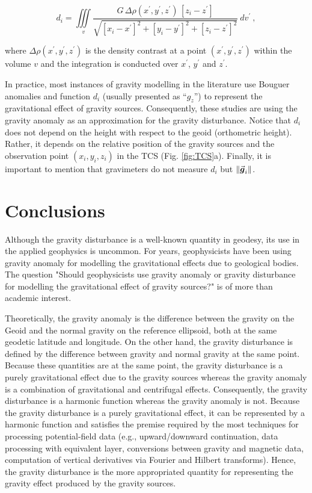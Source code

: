 \documentclass[extra]{gji}
\renewcommand{\vector}[1]{\vec{\mitbf{#1}}}
\begin{document}
\begin{equation}
d_{i} = \iiint\limits_{v}
\frac{G \, \Delta\rho(x^{\prime}, y^{\prime}, z^{\prime}) \,
[z_{i} - z^{\prime}]}
{\sqrt{[x_{i} - x^{\prime}]^{2} +
[y_{i} - y^{\prime}]^{2} + [z_{i} - z^{\prime}]^{2}}} \: dv^{\prime} \: ,
\label{eq:gz-local}
\end{equation}

\noindent
where $\Delta\rho(x^{\prime}, y^{\prime}, z^{\prime})$
is the density contrast at a point $(x^{\prime}, y^{\prime}, z^{\prime})$
within the volume $v$ and the integration is conducted over $x^{\prime}$,
$y^{\prime}$ and $z^{\prime}$.

In practice, most instances of gravity modelling in the literature use Bouguer
anomalies and function $d_{i}$ (usually presented as ``$g_z$'') to represent
the gravitational effect of gravity sources.
Consequently, these studies are using the gravity
anomaly as an approximation for the gravity disturbance.
Notice that $d_{i}$ does not depend on the
height with respect to the geoid (orthometric height).
Rather, it depends on the relative position of the gravity sources and the
observation point $(x_{i}, y_{i}, z_{i})$ in the TCS (Fig. \ref{fig:TCS}a).
Finally, it is important to mention that gravimeters do not measure $d_{i}$ but
$\| \vector{g}_i \|$.


\section{Conclusions}

Although the gravity disturbance is a well-known quantity in geodesy,
its use in the applied geophysics is uncommon.
For years, geophysicists have been using gravity anomaly for modelling
the gravitational effects due to geological bodies.
The question "Should geophysicists use gravity anomaly or gravity
disturbance for modelling the gravitational effect of gravity sources?"
is of more than academic interest.

Theoretically, the gravity anomaly is the difference between the
gravity on the Geoid and the normal gravity on the reference ellipsoid,
both at the same geodetic latitude and longitude.
On the other hand, the gravity disturbance is defined by the difference
between gravity and normal gravity at the same point.
Because these quantities are at the same point, the gravity disturbance
is a purely gravitational effect due to the gravity sources whereas the
gravity anomaly is a combination of gravitational and centrifugal
effects.
Consequently, the gravity disturbance is a harmonic function whereas the
gravity anomaly is not.
Because the gravity disturbance is a purely gravitational effect, it can
be represented by a harmonic function and satisfies the premise required
by the most techniques for processing potential-field data (e.g.,
upward/downward continuation, data processing with equivalent layer,
conversions between gravity and magnetic data, computation of vertical
derivatives via Fourier and Hilbert transforms).
Hence, the gravity disturbance is the more appropriated quantity for
representing the gravity effect produced by the gravity sources.
\end{document}
